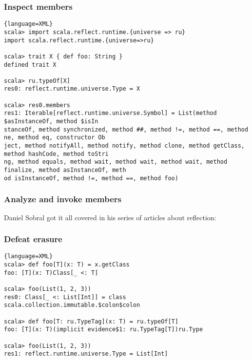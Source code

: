 \documentclass[hyperref={bookmarks=false}]{beamer}
\begin{document}
\begin{frame}[fragile]
\frametitle{Inspect members}

\begin{lstlisting}{language=XML}
scala> import scala.reflect.runtime.{universe => ru}
import scala.reflect.runtime.{universe=>ru}

scala> trait X { def foo: String }
defined trait X

scala> ru.typeOf[X]
res0: reflect.runtime.universe.Type = X

scala> res0.members
res1: Iterable[reflect.runtime.universe.Symbol] = List(method $asInstanceOf, method $isIn
stanceOf, method synchronized, method ##, method !=, method ==, method ne, method eq, constructor Ob
ject, method notifyAll, method notify, method clone, method getClass, method hashCode, method toStri
ng, method equals, method wait, method wait, method wait, method finalize, method asInstanceOf, meth
od isInstanceOf, method !=, method ==, method foo)
\end{lstlisting}
\end{frame}

\begin{frame}[fragile]
\frametitle{Analyze and invoke members}

Daniel Sobral got it all covered in his series of articles about reflection:

\end{frame}

\begin{frame}[fragile]
\frametitle{Defeat erasure}

\begin{lstlisting}{language=XML}
scala> def foo[T](x: T) = x.getClass
foo: [T](x: T)Class[_ <: T]

scala> foo(List(1, 2, 3))
res0: Class[_ <: List[Int]] = class scala.collection.immutable.$colon$colon

scala> def foo[T: ru.TypeTag](x: T) = ru.typeOf[T]
foo: [T](x: T)(implicit evidence$1: ru.TypeTag[T])ru.Type

scala> foo(List(1, 2, 3))
res1: reflect.runtime.universe.Type = List[Int]
\end{lstlisting}
\end{frame}
\end{document}
